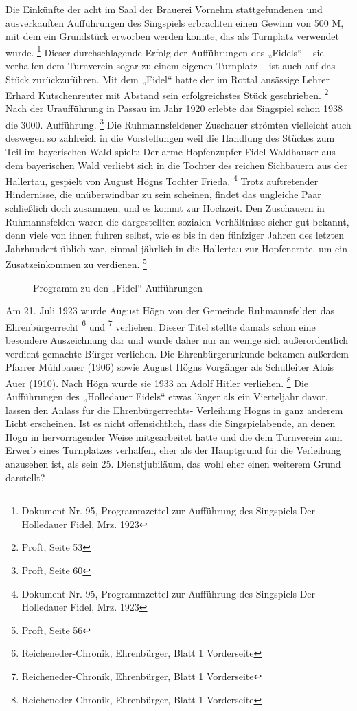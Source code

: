 Die Einkünfte der acht im Saal der Brauerei Vornehm stattgefundenen und
ausverkauften Aufführungen des Singspiels erbrachten einen Gewinn von
500 M, mit dem ein Grundstück erworben werden konnte, das als Turnplatz
verwendet wurde. \footnote{Dokument Nr. 95, Programmzettel zur
Aufführung des Singspiels {\textquotedbl}Der Holledauer
Fidel{\textquotedbl}, Mrz. 1923} Dieser durchschlagende Erfolg der
Aufführungen des „Fidels“ – sie verhalfen dem Turnverein sogar zu einem
eigenen Turnplatz – ist auch auf das Stück zurückzuführen. Mit dem
„Fidel“ hatte der im Rottal ansässige Lehrer Erhard Kutschenreuter mit
Abstand sein erfolgreichstes Stück geschrieben. \footnote{Proft, Seite
53} Nach der Uraufführung in Passau im Jahr 1920 erlebte das Singspiel
schon 1938 die 3000. Aufführung. \footnote{Proft, Seite 60} Die
Ruhmannsfeldener Zuschauer strömten vielleicht auch deswegen so
zahlreich in die Vorstellungen weil die Handlung des Stückes zum Teil
im bayerischen Wald spielt: Der arme Hopfenzupfer Fidel Waldhauser aus
dem bayerischen Wald verliebt sich in die Tochter des reichen
Sichbauern aus der Hallertau, gespielt von August Högns Tochter
Frieda. \footnote{Dokument Nr. 95, Programmzettel zur Aufführung des
Singspiels {\textquotedbl}Der Holledauer Fidel{\textquotedbl}, Mrz.
1923} Trotz auftretender Hindernisse, die unüberwindbar zu sein
scheinen, findet das ungleiche Paar schließlich doch zusammen, und es
kommt zur Hochzeit. Den Zuschauern in Ruhmannsfelden waren die
dargestellten sozialen Verhältnisse sicher gut bekannt, denn viele von
ihnen fuhren selbst, wie es bis in den fünfziger Jahren des letzten
Jahrhundert üblich war, einmal jährlich in die Hallertau zur
Hopfenernte, um ein Zusatzeinkommen zu verdienen. \footnote{Proft,
Seite 56}

\begin{figure}
\caption{Programm zu den „Fidel“-Aufführungen}
\end{figure}

Am 21. Juli 1923 wurde August Högn von der Gemeinde Ruhmannsfelden das
Ehrenbürgerrecht 
\footnote{Reicheneder-Chronik, Ehrenbürger, Blatt 1 Vorderseite} und
 \footnote{Reicheneder-Chronik, Ehrenbürger, Blatt 1
Vorderseite} verliehen. Dieser Titel stellte damals schon eine besondere
Auszeichnung dar und wurde daher nur an wenige sich außerordentlich
verdient gemachte Bürger verliehen. Die Ehrenbürgerurkunde bekamen
außerdem Pfarrer Mühlbauer (1906) sowie August Högns Vorgänger als
Schulleiter Alois Auer (1910). Nach Högn wurde sie 1933 an Adolf Hitler
verliehen. \footnote{Reicheneder-Chronik, Ehrenbürger, Blatt 1
Vorderseite} Die Aufführungen des „Holledauer Fidels“ etwas länger als
ein Vierteljahr davor, lassen den Anlass für die Ehrenbürgerrechts-
Verleihung Högns in ganz anderem Licht erscheinen. Ist es nicht
offensichtlich, dass die Singspielabende, an denen Högn in
hervorragender Weise mitgearbeitet hatte und die dem Turnverein zum
Erwerb eines Turnplatzes verhalfen, eher als der Hauptgrund für die
Verleihung anzusehen ist, als sein 25. Dienstjubiläum, das wohl eher
einen weiterem Grund darstellt?

